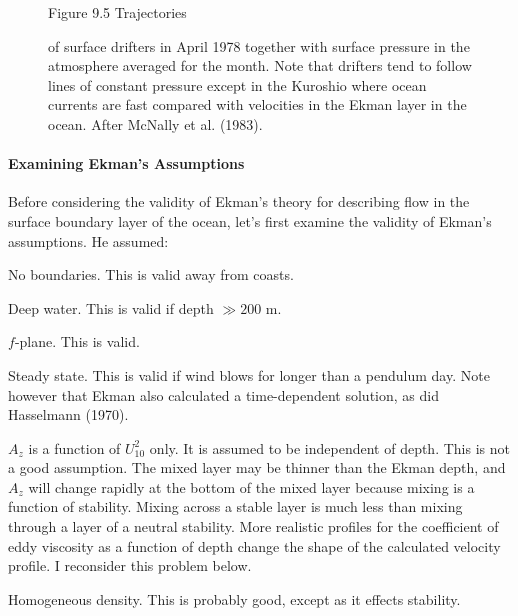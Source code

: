 \begin{figure}[t!]
\footnotesize
Figure 9.5 Trajectories \rule{0mm}{3ex}of surface
drifters in April 1978 together with
surface pressure in the atmosphere averaged for the month. Note that
drifters tend to follow lines of constant pressure except in the
Kuroshio where ocean currents are
fast compared with velocities in the Ekman layer in the ocean. After
McNally et al. (1983).
\label{drifterplot}
\vspace{-3ex}
\end{figure}

\paragraph{Examining Ekman's Assumptions}
Before considering the
validity of Ekman's theory for describing flow in the surface boundary
layer of the ocean, let's first examine the validity of Ekman's
assumptions. He assumed:
\begin{enumerate}
\vitem No boundaries. This is valid away from coasts.
  
\vitem Deep water. This is valid if depth $\gg 200$ m.

\vitem $f$-plane. This is valid.

\vitem Steady state. This is valid if wind blows for longer than a
pendulum day.  Note however that Ekman also calculated a
time-dependent solution, as did Hasselmann (1970).

\vitem $A_z$ is a function of $U^2_{10}$ only. It is assumed to be
independent of depth. This is not a good assumption. The mixed
layer may be thinner than the Ekman
depth, and $A_z$ will change rapidly at the bottom of the mixed
layer because mixing is a function
of stability. Mixing across a stable layer is much less than mixing
through a layer of a neutral stability. More realistic profiles for
the coefficient of eddy viscosity as a function of depth change the
shape of the calculated velocity profile. I reconsider this problem
below.

\vitem Homogeneous density. This is probably good, except as it
effects stability.
\end{enumerate}


